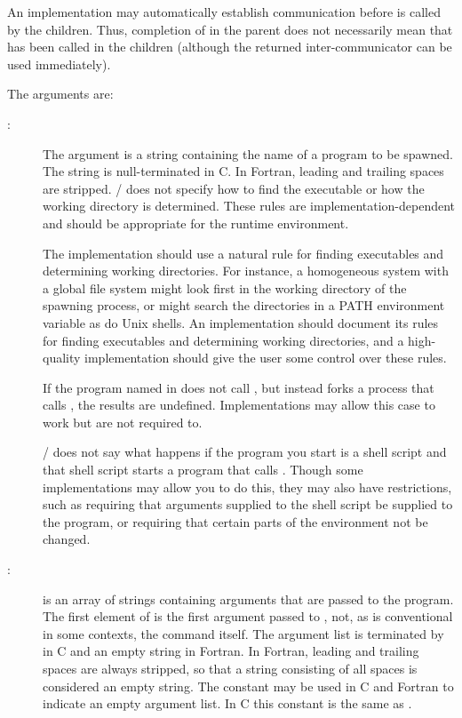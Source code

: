 \begin{users}
An implementation may automatically establish communication before
 is called by the children. Thus, completion of
 in the parent does not necessarily mean that
 has been called in the children (although the
returned inter-communicator can be used immediately).
\end{users}

The arguments are:
\begin{description}
\item[:]
The  argument is a string containing the name of
a program to be spawned. The string is null-terminated in C.
In Fortran, leading and trailing spaces are stripped.
\MPI/ does not specify how to find the executable or how the working
directory is determined. These rules are implementation-dependent
and should be appropriate for the runtime environment.

\begin{implementors}
The implementation should use a natural rule for finding
executables and determining working directories.  For instance, a
homogeneous system with a global file system might look first in the
working directory of the spawning process, or might search the
directories in a PATH environment variable as do Unix shells.
An implementation
should document its rules for finding executables and determining
working directories, and a high-quality implementation should give the
user some control over these rules.
\end{implementors}

If the program named in  does not call
, but instead forks a process that calls
, the results are undefined. Implementations
may allow this case to work but are not required to.

\begin{users}
\MPI/ does not say what happens if the program you start is
a shell script and that shell script starts a program that
calls . Though some implementations may allow
you to do this, they may also have restrictions, such as requiring
that arguments supplied to the shell script be supplied
to the program, or requiring that certain parts of the environment
not be changed.
\end{users}

\item[:]
 is an array of strings containing
arguments that are passed to the program.
The first element of  is the first argument
passed to , not, as is conventional in
some contexts, the command itself. The argument list is terminated
by  in C and an empty string
in Fortran. In Fortran,
leading and trailing spaces are always stripped, so that a string consisting
of all spaces is considered an empty string.
The constant  may be used in C and
Fortran to indicate an empty argument list. In C this constant is the same as
.




\end{description}
